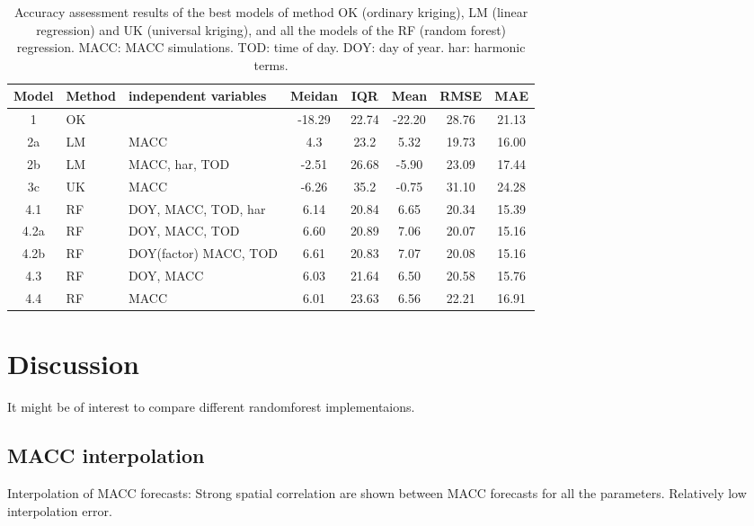 \documentclass{article}
\begin{document}
\begin{table}[tbp]
\centering
\begin{tabular}{ c l l c c c c c}
  \toprule
 Model &Method& independent variables& Meidan & IQR& Mean&  RMSE& MAE \\
 \midrule
 1     &OK & \-                 & -18.29 &	22.74&	-22.20 &	28.76 &	21.13\\
 2a    &LM & MACC                  & 4.3   & 23.2     & 5.32 & 19.73 & 16.00 \\
 2b    &LM & MACC, har, TOD   & -2.51 & 26.68 & -5.90 & 23.09 & 17.44\\ 
 3c    &UK & MACC             & -6.26 & 35.2 & -0.75 & 31.10 & 24.28\\
 4.1   &RF & DOY, MACC, TOD, har &  6.14 &	20.84 &	6.65 &	20.34 &	15.39\\
 4.2a  &RF & DOY, MACC, TOD                     & 6.60 &	20.89	& 7.06 &	20.07 &	15.16 \\
 4.2b  &RF & DOY(factor) MACC, TOD  & 6.61&	20.83	& 7.07 &	20.08	& 15.16 \\
 4.3   &RF & DOY, MACC              & 6.03&	21.64	& 6.50 &	20.58	& 15.76 \\
 4.4   &RF & MACC                   &6.01 &	23.63	& 6.56 &	22.21	& 16.91 \\
\bottomrule
\end{tabular}
\caption{Accuracy assessment results of the best models of method OK (ordinary kriging), LM (linear regression) and UK (universal kriging), and all the models of the RF (random forest) regression. MACC: MACC simulations. TOD: time of day. DOY: day of year. har: harmonic terms.  
 } 
\label{table:result}
\end{table} 
 
 
\section{Discussion}

It might be of interest to compare different randomforest
implementaions.

\subsection{MACC interpolation} 
Interpolation of MACC forecasts: Strong spatial correlation are shown
between MACC forecasts for all the parameters. Relatively low
interpolation error.
\end{document}
